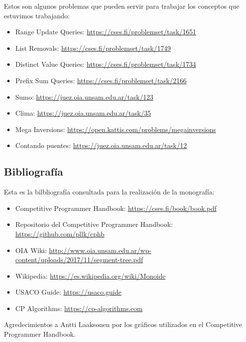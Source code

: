 \documentclass{article}
\begin{document}
Estos son algunos problemas que pueden servir para trabajar los conceptos que estuvimos trabajando:
\begin{itemize}
    \item Range Update Queries: \href{https://cses.fi/problemset/task/1651}{https://cses.fi/problemset/task/1651}
    \item List Removals: \href{https://cses.fi/problemset/task/1749}{https://cses.fi/problemset/task/1749}
    \item Distinct Value Queries: \href{https://cses.fi/problemset/task/1734}{https://cses.fi/problemset/task/1734}
    \item Prefix Sum Queries: \href{https://cses.fi/problemset/task/2166}{https://cses.fi/problemset/task/2166}
    \item Sumo: \href{https://juez.oia.unsam.edu.ar/task/123}{https://juez.oia.unsam.edu.ar/task/123}
    \item Clima: \href{https://juez.oia.unsam.edu.ar/task/35}{https://juez.oia.unsam.edu.ar/task/35}
    \item Mega Inversions: \href{https://open.kattis.com/problems/megainversions}{https://open.kattis.com/problems/megainversions}
    \item Contando puentes: \href{https://juez.oia.unsam.edu.ar/task/12}{https://juez.oia.unsam.edu.ar/task/12}
\end{itemize}

\subsection{Bibliografía}

Esta es la bilbliografía consultada para la realización de la monografía:
\begin{itemize}
    \item Competitive Programmer Handbook: \href{https://cses.fi/book/book.pdf}{https://cses.fi/book/book.pdf}
    \item Repositorio del Competitive Programmer Handbook: \href{https://github.com/pllk/cphb}{https://github.com/pllk/cphb}
    \item OIA Wiki: \href{http://www.oia.unsam.edu.ar/wp-content/uploads/2017/11/segment-tree.pdf}{http://www.oia.unsam.edu.ar/wp-content/uploads/2017/11/segment-tree.pdf}
    \item Wikipedia: \href{https://es.wikipedia.org/wiki/Monoide}{https://es.wikipedia.org/wiki/Monoide}
    \item USACO Guide: \href{https://usaco.guide}{https://usaco.guide}
    \item CP Algorithms: \href{https://cp-algorithms.com}{https://cp-algorithms.com}
\end{itemize}
Agredecimientos a Antti Laaksonen por los gráficos utilizados en el Competitive Programmer Handbook.
\end{document}
